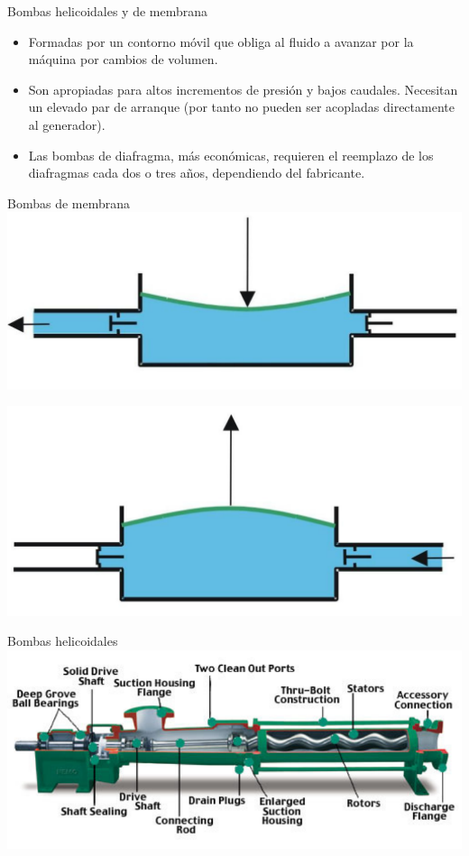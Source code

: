 \documentclass[xcolor={usenames,svgnames,dvipsnames}]{beamer}
\begin{document}
\begin{frame}[label=sec-2-2-3]{Bombas helicoidales y de membrana}
\begin{itemize}
\item Formadas por un \alert{contorno móvil} que obliga al fluido a avanzar por
la máquina por \alert{cambios de volumen}.

\item Son apropiadas para \alert{altos incrementos de presión y bajos caudales}.
Necesitan un \alert{elevado par de arranque} (por tanto no pueden ser
acopladas directamente al generador).

\item Las bombas de diafragma, más económicas, requieren el \alert{reemplazo de
los diafragmas} cada dos o tres años, dependiendo del fabricante.
\end{itemize}
\end{frame}

\begin{frame}[label=sec-2-2-4]{Bombas de membrana}
\includegraphics[width=.9\linewidth]{../figs/800px-Bomba_diafragma_impulsando.pdf}

\includegraphics[width=.9\linewidth]{../figs/Bomba_diafragma_aspirando.pdf}
\end{frame}

\begin{frame}[label=sec-2-2-5]{Bombas helicoidales}
\includegraphics[width=.9\linewidth]{../figs/bombatornillo.pdf}
\end{frame}
\end{document}

